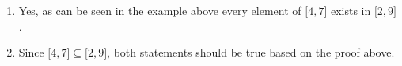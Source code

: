\documentclass{article}
\begin{document}
\begin{enumerate}
\begin{enumerate}
                    \vspace{5ex}\item Yes, as can be seen in the example above every element of $\lbrack 4,7 \rbrack$ exists in $\lbrack 2,9 \rbrack$.

                    \item Since $\lbrack 4, 7 \rbrack \subseteq \lbrack 2,9 \rbrack$, both statements should be true based on the proof above.
                    \end{enumerate}
    \end{enumerate}
\end{document}
